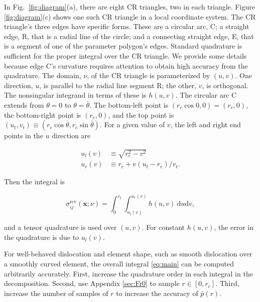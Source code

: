 \documentclass[11pt]{article}
\renewcommand{\vec}[1]{\boldsymbol{#1}}
\newcommand{\rmax}{r_c}
\begin{document}
In Fig.~\ref{fig:diagram}(a),
there are eight CR triangles, two in each triangle.
Figure \ref{fig:diagram}(c) shows one such CR triangle in a local coordinate system.
The CR triangle's three edges have specific forms.
These are a circular arc, C;
a straight edge, R, that is a radial line of the circle;
and a connecting straight edge, E, that is a segment of one of the parameter polygon's edges.
Standard quadrature is sufficient for the proper integral over the CR triangle.
We provide some details because edge C's curvature
requires attention to obtain high accuracy from the quadrature.
The domain, $\nu$, of the CR triangle is parameterized by $(u,v)$.
One direction, $u$, is parallel to the radial line segment R;
the other, $v$, is orthogonal.
The nonsingular integrand in terms of these is $h(u,v)$.
The circular arc C extends from $\theta = 0$ to $\theta = \bar{\theta}$.
The bottom-left point is $(\rmax \cos 0, 0) = (\rmax, 0)$,
the bottom-right point is $(r_e, 0)$,
and the top point is $(u_t, v_t) \equiv (\rmax \cos \bar{\theta}, \rmax \sin \bar{\theta})$.
For a given value of $v$, the left and right end points in the $u$ direction are
\begin{linenomath}\begin{align*}
  u_l(v) &\equiv \sqrt{\rmax^2 - v^2} \\
  u_r(v) &\equiv r_e + v (u_t - r_e)/v_t.
\end{align*}\end{linenomath}
Then the integral is
\begin{linenomath}\begin{equation*}
  \sigma_{ij}^\mathrm{rcv}(\vec{x}; \nu) =
    \int_0^{v_t} \int_{u_l(v)}^{u_r(v)} h(u,v) \ \mathrm{d} u \mathrm{d} v,
\end{equation*}\end{linenomath}
and a tensor quadrature is used over $(u,v)$.
For constant $h(u,v)$, the error in the quadrature is due to $u_l(v)$.

For well-behaved dislocation and element shape,
such as smooth dislocation over a smoothly curved element,
the overall integral \eqref{eq:main} can be computed arbitrarily accurately.
First, increase the quadrature order
in each integral in the decomposition.
Second, use Appendix \ref{sec:Fr0} to sample $r \in [0,r_c]$.
Third, increase the number of samples of $r$ to increase the accuracy of $\bar{p}(r)$.
\end{document}
